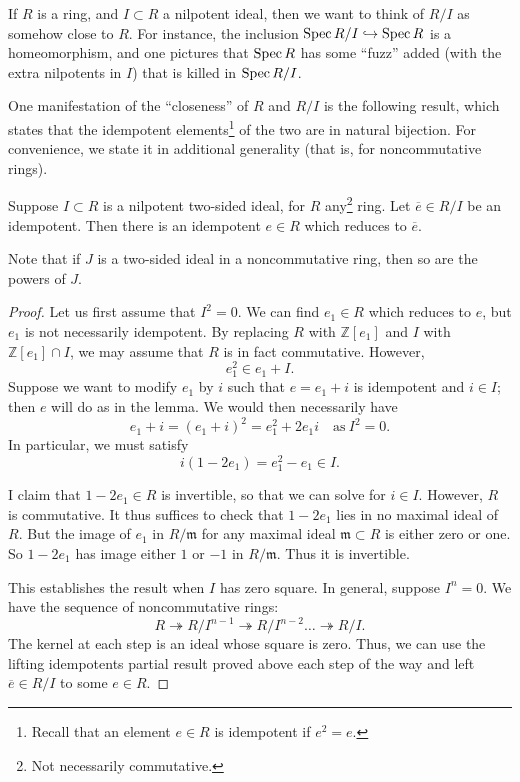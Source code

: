If $R$ is a ring, and $I \subset R$ a nilpotent ideal, then we want to think
of $R/I$ as somehow close to $R$. For instance, the inclusion $\operatorname{Spec} R/I
\hookrightarrow \operatorname{Spec} R$ is a homeomorphism, and one pictures that $\operatorname{Spec} R$
has some ``fuzz'' added (with the extra nilpotents in $I$) that is killed in
$\operatorname{Spec} R/I$.

One manifestation of the ``closeness'' of $R$ and $R/I$ is the following
result, which states that the idempotent elements\footnote{Recall that an
element $e \in R$ is idempotent if $e^2 = e$.} of the two are in natural
bijection.
For convenience, we state it in additional generality (that is, for
noncommutative rings).

\begin{lemma}
Suppose $I \subset R$ is a nilpotent two-sided ideal, for $R$ any\footnote{Not
necessarily commutative.} ring. Let
$\overline{e} \in R/I$ be an idempotent. Then there is an idempotent $e
\in R$ which reduces to $\overline{e}$.
\end{lemma} 

Note that if $J$ is a two-sided ideal in a noncommutative ring, then so are the
powers of $J$.

\begin{proof} Let us first assume that $I^2 = 0$. 
We can find $e_1 \in R$ which reduces to $e$, but $e_1$ is not necessarily
idempotent.
By replacing $R$ with $\mathbb{Z}[e_1]$ and $I$ with $\mathbb{Z}[e_1] \cap I$,
we may assume that $R$ is in fact commutative. 	
However, 
\[ e_1^2 \in e_1 + I.  \]
Suppose we want to modify $e_1$ by $i$ such that $e = e_1 + i$ is
idempotent and $i \in I$; then $e$ will do as in the lemma. We would then
necessarily have
\[ e_1 + i = (e_1 + i)^2 = e_1^2 + 2e_1 i\quad \mathrm{as} \ I^2 =0 .  \]
In particular, we must satisfy
\[ i(1-2e_1) = e_1^2 - e_1  \in I. \]

I claim that $1 - 2e_1 \in R$ is invertible, so that we can solve for $i \in I$. 
However, $R$ is commutative. It thus suffices to check that $1 - 2e_1$ lies in
no maximal ideal of $R$. But the image of $e_1$ in $R/\mathfrak{m}$ for any
maximal ideal $\mathfrak{m} \subset R$ is either zero or one. So $1 - 2e_1$ has
image either $1$ or $-1$ in $R/\mathfrak{m}$. Thus it is invertible. 

This establishes the result when $I$ has zero square. In general, suppose $I^n
= 0$. We have the sequence of noncommutative rings:
\[ R \twoheadrightarrow R/I^{n-1} \twoheadrightarrow R/I^{n-2} \dots
\twoheadrightarrow R/I. \]
The kernel at each step is an ideal whose square is zero. Thus, we can use the
lifting idempotents partial result proved above each step of the way and left
$\overline{e}  \in R/I$ to some $e \in R$. 
\end{proof} 


